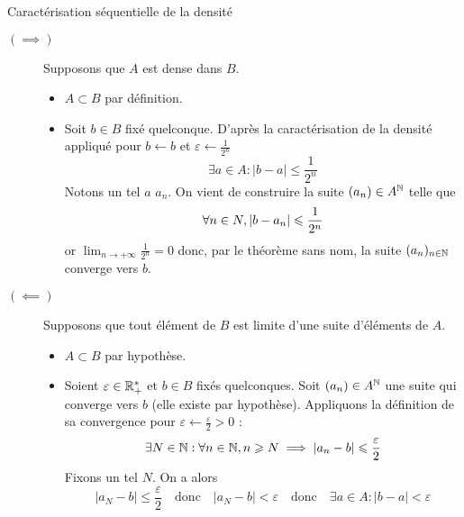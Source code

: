 \documentclass{article}
\begin{document}
\begin{question_kholle}{Caractérisation séquentielle de la densité}
  \hfill\\
  \begin{description}
    \item[$(\implies)$] Supposons que $A$ est dense dans $B$.
          \begin{itemize}
            \item $A\subset B$ par définition.
            \item Soit $b\in B$ fixé quelconque. D’après la caractérisation de la densité appliqué pour $b\leftarrow b$ et $\varepsilon\leftarrow \frac{1}{2^{n}}$
                  \[
                    \exists a\in A: |b-a|\leq \frac{1}{2^{n}}
                  \]
                  Notons un tel $a$ $a_{n}$. On vient de construire la suite $(a_{n})\in A^{\N}$ telle que
                  \[
                    \forall n\in N, |b-a_{n}|\leq \frac{1}{2^{n}}\\
                  \]
                  or $\displaystyle\lim_{n\to +\infty}\frac{1}{2^{n}}=0$ donc, par le théorème sans nom, la suite $(a_{n})_{n\in\N}$ converge vers $b$.
          \end{itemize}
    \item[$(\impliedby)$] Supposons que tout élément de $B$ est limite d’une suite d’éléments de $A$.
          \begin{itemize}
            \item $A\subset B$ par hypothèse.
            \item Soient $\varepsilon\in\R_{+}^{*}$ et $b\in B$ fixés quelconques.
                  Soit $(a_{n})\in A^{\N}$ une suite qui converge vers $b$ (elle existe par hypothèse). Appliquons la définition de sa convergence pour $\varepsilon\leftarrow \frac{\varepsilon}{2}>0$ :
                  \[
                    \exists N\in\N: \forall n\in\N, n\geq N \implies |a_{n}-b|\leq \frac{\varepsilon}{2}
                  \]
                  Fixons un tel $N$. On a alors
                  \[
                    |a_{N}-b|\leq \frac{\varepsilon}{2} \quad \text{donc} \quad |a_{N}-b|<\varepsilon \quad \text{donc} \quad \exists a\in A: |b-a|<\varepsilon
                  \]
          \end{itemize}
  \end{description}
\end{question_kholle}
\end{document}
